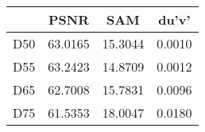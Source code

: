 \begin{tabular}{cccc}
  \hline
   & PSNR & SAM & du'v' \\
  \hline
  D50 & 63.0165 & 15.3044 & 0.0010 \\
  D55 & 63.2423 & 14.8709 & 0.0012 \\
  D65 & 62.7008 & 15.7831 & 0.0096 \\
  D75 & 61.5353 & 18.0047 & 0.0180 \\
  \hline
\end{tabular}
